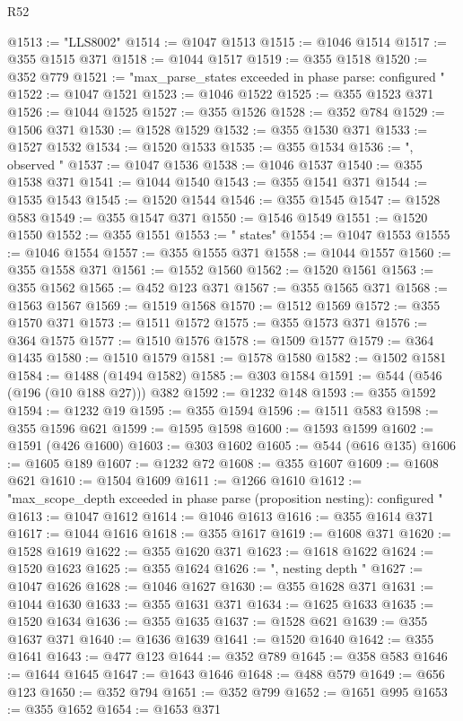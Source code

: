 \begin{lexlean}{R52}
\begin{coremodule}
@1513 := "LLS8002"
@1514 := @1047 @1513
@1515 := @1046 @1514
@1517 := @355 @1515 @371
@1518 := @1044 @1517
@1519 := @355 @1518
@1520 := @352 @779
@1521 := "max_parse_states exceeded in phase parse: configured "
@1522 := @1047 @1521
@1523 := @1046 @1522
@1525 := @355 @1523 @371
@1526 := @1044 @1525
@1527 := @355 @1526
@1528 := @352 @784
@1529 := @1506 @371
@1530 := @1528 @1529
@1532 := @355 @1530 @371
@1533 := @1527 @1532
@1534 := @1520 @1533
@1535 := @355 @1534
@1536 := ", observed "
@1537 := @1047 @1536
@1538 := @1046 @1537
@1540 := @355 @1538 @371
@1541 := @1044 @1540
@1543 := @355 @1541 @371
@1544 := @1535 @1543
@1545 := @1520 @1544
@1546 := @355 @1545
@1547 := @1528 @583
@1549 := @355 @1547 @371
@1550 := @1546 @1549
@1551 := @1520 @1550
@1552 := @355 @1551
@1553 := " states"
@1554 := @1047 @1553
@1555 := @1046 @1554
@1557 := @355 @1555 @371
@1558 := @1044 @1557
@1560 := @355 @1558 @371
@1561 := @1552 @1560
@1562 := @1520 @1561
@1563 := @355 @1562
@1565 := @452 @123 @371
@1567 := @355 @1565 @371
@1568 := @1563 @1567
@1569 := @1519 @1568
@1570 := @1512 @1569
@1572 := @355 @1570 @371
@1573 := @1511 @1572
@1575 := @355 @1573 @371
@1576 := @364 @1575
@1577 := @1510 @1576
@1578 := @1509 @1577
@1579 := @364 @1435
@1580 := @1510 @1579
@1581 := @1578 @1580
@1582 := @1502 @1581
@1584 := @1488 (@1494 @1582)
@1585 := @303 @1584
@1591 := @544 (@546 (@196 (@10 @188 @27))) @382
@1592 := @1232 @148
@1593 := @355 @1592
@1594 := @1232 @19
@1595 := @355 @1594
@1596 := @1511 @583
@1598 := @355 @1596 @621
@1599 := @1595 @1598
@1600 := @1593 @1599
@1602 := @1591 (@426 @1600)
@1603 := @303 @1602
@1605 := @544 (@616 @135)
@1606 := @1605 @189
@1607 := @1232 @72
@1608 := @355 @1607
@1609 := @1608 @621
@1610 := @1504 @1609
@1611 := @1266 @1610
@1612 := "max_scope_depth exceeded in phase parse (proposition nesting): configured "
@1613 := @1047 @1612
@1614 := @1046 @1613
@1616 := @355 @1614 @371
@1617 := @1044 @1616
@1618 := @355 @1617
@1619 := @1608 @371
@1620 := @1528 @1619
@1622 := @355 @1620 @371
@1623 := @1618 @1622
@1624 := @1520 @1623
@1625 := @355 @1624
@1626 := ", nesting depth "
@1627 := @1047 @1626
@1628 := @1046 @1627
@1630 := @355 @1628 @371
@1631 := @1044 @1630
@1633 := @355 @1631 @371
@1634 := @1625 @1633
@1635 := @1520 @1634
@1636 := @355 @1635
@1637 := @1528 @621
@1639 := @355 @1637 @371
@1640 := @1636 @1639
@1641 := @1520 @1640
@1642 := @355 @1641
@1643 := @477 @123
@1644 := @352 @789
@1645 := @358 @583
@1646 := @1644 @1645
@1647 := @1643 @1646
@1648 := @488 @579
@1649 := @656 @123
@1650 := @352 @794
@1651 := @352 @799
@1652 := @1651 @995
@1653 := @355 @1652
@1654 := @1653 @371

\end{coremodule}
\end{lexlean}
